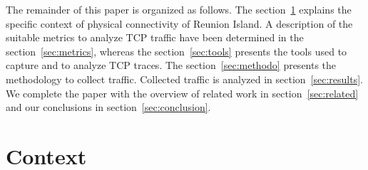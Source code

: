 \documentclass[10pt, conference, a4paper, twocolumns]{IEEEtran}
\begin{document}
The remainder of this paper is organized as follows. The section~\ref{sec:description} 
explains the specific context of physical connectivity of Reunion Island.
A description of the suitable metrics to analyze TCP traffic have been determined in the section~\ref{sec:metrics}, whereas the section~\ref{sec:tools} presents the tools used to capture and to analyze TCP traces. The section~\ref{sec:methodo} presents the methodology to collect traffic. Collected traffic is analyzed in section~\ref{sec:results}. We complete the paper with the overview of related work in section~\ref{sec:related} and our conclusions in section~\ref{sec:conclusion}.

\section{Context}
\label{sec:description}

\end{document}
